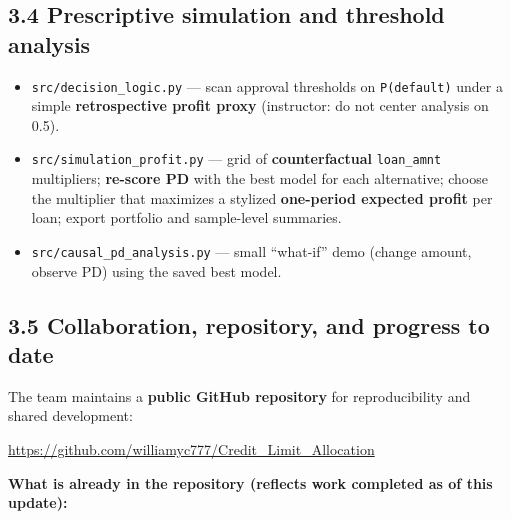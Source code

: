 \documentclass[12pt,letterpaper]{report}
\begin{document}
\subsection*{3.4 Prescriptive simulation and threshold analysis}

\begin{itemize}
    \item \texttt{src/decision\_logic.py} --- scan approval thresholds on \texttt{P(default)} under a simple \textbf{retrospective profit proxy} (instructor: do not center analysis on 0.5).
    \item \texttt{src/simulation\_profit.py} --- grid of \textbf{counterfactual} \texttt{loan\_amnt} multipliers; \textbf{re-score PD} with the best model for each alternative; choose the multiplier that maximizes a stylized \textbf{one-period expected profit} per loan; export portfolio and sample-level summaries.
    \item \texttt{src/causal\_pd\_analysis.py} --- small ``what-if'' demo (change amount, observe PD) using the saved best model.
\end{itemize}

\subsection*{3.5 Collaboration, repository, and progress to date}

The team maintains a \textbf{public GitHub repository} for reproducibility and shared development:

\begin{center}
\url{https://github.com/williamyc777/Credit_Limit_Allocation}
\end{center}

\noindent\textbf{What is already in the repository (reflects work completed as of this update):}
\end{document}

